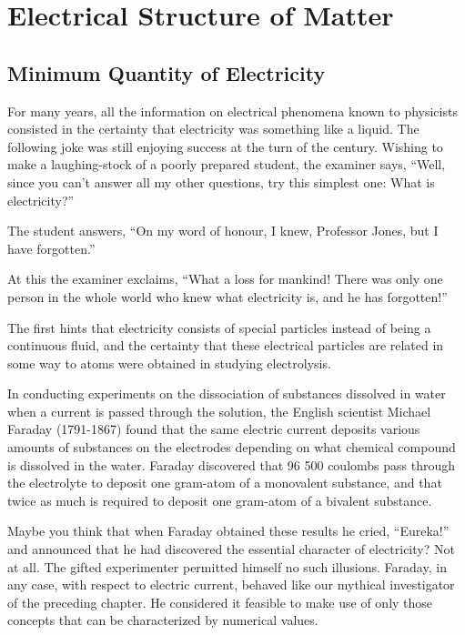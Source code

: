 

\cleardoublepage
\chapter{Electrical Structure of Matter}
\label{ch-02}

\section{Minimum Quantity of Electricity}
For many years, all the information on electrical phenomena known to physicists consisted in the certainty that electricity was something like a liquid. The following joke was still enjoying success at the turn of the century. Wishing to make a laughing-stock of a poorly prepared student, the examiner says, ``Well, since you can't answer all my other questions, try this simplest one: What is electricity?''

The student answers, ``On my word of honour, I knew, Professor Jones, but I have forgotten.''

At this the examiner exclaims, ``What a loss for mankind! There was only one person in the whole world who knew what electricity is, and he has forgotten!''

The first hints that electricity consists of special particles instead of being a continuous fluid, and the certainty that these electrical particles are related in some way to atoms were obtained in studying electrolysis.

In conducting experiments on the dissociation of substances dissolved in water when a current is passed through the solution, the English scientist Michael Faraday (1791-1867) found that the same electric current deposits various amounts of substances on the electrodes depending on what chemical compound is dissolved in the water. Faraday discovered that 96 500 coulombs pass through the electrolyte to deposit one gram-atom of a monovalent substance, and that twice as much is required to deposit one gram-atom of a bivalent substance.

Maybe you think that when Faraday obtained these results he cried, ``Eureka!'' and announced that he had discovered the essential character of electricity? Not at all. The gifted experimenter permitted himself no such illusions. Faraday, in any case, with respect to electric current, behaved like our mythical investigator of the preceding chapter. He considered it feasible to make use of only those concepts that can be characterized by numerical values.

